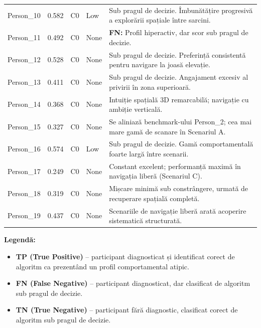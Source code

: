 \documentclass[12pt,a4paper]{report}
\theoremstyle{definition}
\theoremstyle{remark}
\begin{document}
\begin{table}[H]
\begin{tabularx}{\textwidth}{l c c l X}
        Person\_10 & 0.582 & C0 & Low & Sub pragul de decizie. Îmbunătățire progresivă a explorării spațiale între sarcini. \\

        Person\_11 & 0.492 & C0 & None & \textbf{FN:} Profil hiperactiv, dar scor sub pragul de decizie. \\

        Person\_12 & 0.528 & C0 & None & Sub pragul de decizie. Preferință consistentă pentru navigare la joasă elevație. \\

        Person\_13 & 0.411 & C0 & None & Sub pragul de decizie. Angajament excesiv al privirii în zona superioară. \\

        Person\_14 & 0.368 & C0 & None & Intuiție spațială 3D remarcabilă; navigație cu ambiție verticală. \\

        Person\_15 & 0.327 & C0 & None & Se aliniază benchmark-ului Person\_2; cea mai mare gamă de scanare în Scenariul A. \\

        Person\_16 & 0.574 & C0 & Low & Sub pragul de decizie. Gamă comportamentală foarte largă între scenarii. \\

        Person\_17 & 0.249 & C0 & None & Constant excelent; performanță maximă în navigația liberă (Scenariul C). \\

        Person\_18 & 0.319 & C0 & None & Mișcare minimă sub constrângere, urmată de recuperare spațială completă. \\

        Person\_19 & 0.437 & C0 & None & Scenariile de navigație liberă arată acoperire sistematică structurată. \\
        
        \bottomrule
    \end{tabularx}
\end{table}

\vspace{0.3cm}

\noindent
\textbf{Legendă:}
\begin{itemize}
    \item \textbf{TP (True Positive)} -- participant diagnosticat și identificat corect de algoritm ca prezentând un profil comportamental atipic.
    \item \textbf{FN (False Negative)} -- participant diagnosticat, dar clasificat de algoritm sub pragul de decizie.
    \item \textbf{TN (True Negative)} -- participant fără diagnostic, clasificat corect de algoritm sub pragul de decizie.
\end{itemize}
\end{document}
